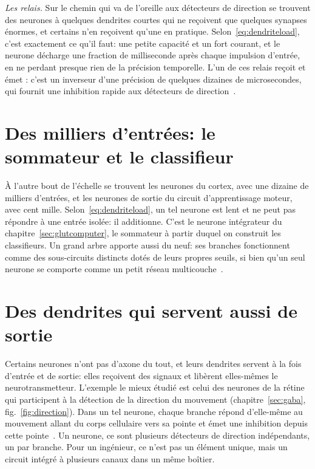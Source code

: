 \emph{Les relais.} Sur le chemin qui va de l'oreille aux détecteurs de direction se trouvent des neurones à quelques dendrites courtes qui ne reçoivent que quelques synapses énormes, et certains n'en reçoivent qu'une en pratique. Selon~\eqref{eq:dendriteload}, c'est exactement ce qu'il faut: une petite capacité et un fort courant, et le neurone décharge une fraction de milliseconde après chaque impulsion d'entrée, en ne perdant presque rien de la précision temporelle. L'un de ces relais reçoit  et émet : c'est un inverseur d'une précision de quelques dizaines de microsecondes, qui fournit une inhibition rapide aux détecteurs de direction~\cite{BorstSoria2012}.

\section{Des milliers d'entrées: le sommateur et le classifieur}

À l'autre bout de l'échelle se trouvent les neurones  du cortex, avec une dizaine de milliers d'entrées, et les neurones  de sortie du circuit d'apprentissage moteur, avec cent mille. Selon~\eqref{eq:dendriteload}, un tel neurone est lent et ne peut pas répondre à une entrée isolée: il additionne. C'est le neurone intégrateur du chapitre~\ref{sec:glutcomputer}, le sommateur à partir duquel on construit les classifieurs. Un grand arbre apporte aussi du neuf: ses branches fonctionnent comme des sous-circuits distincts dotés de leurs propres seuils, si bien qu'un seul neurone se comporte comme un petit réseau multicouche~\cite{Beniaguev2021,Gidon2020}.

\section{Des dendrites qui servent aussi de sortie}

Certains neurones n'ont pas d'axone du tout, et leurs dendrites servent à la fois d'entrée et de sortie: elles reçoivent des signaux et libèrent elles-mêmes le neurotransmetteur. L'exemple le mieux étudié est celui des neurones  de la rétine qui participent à la détection de la direction du mouvement (chapitre~\ref{sec:gaba}, fig.~\ref{fig:direction}). Dans un tel neurone, chaque branche répond d'elle-même au mouvement allant du corps cellulaire vers sa pointe et émet une inhibition depuis cette pointe~\cite{Euler2002}. Un neurone, ce sont plusieurs détecteurs de direction indépendants, un par branche. Pour un ingénieur, ce n'est pas un élément unique, mais un circuit intégré à plusieurs canaux dans un même boîtier.

